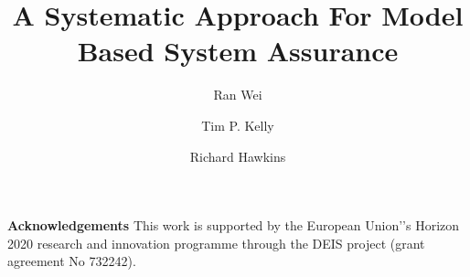 \documentclass[runningheads,a4paper]{llncs}
\begin{document}
 
\title{\textbf{A Systematic Approach For Model Based System Assurance}}
\author{Ran Wei \and Tim P. Kelly \and Richard Hawkins}
\maketitle















\noindent\textbf{Acknowledgements}
This work is supported by the European Union'’s Horizon 2020 research and innovation programme through the DEIS project (grant agreement No 732242). 

 
  
\end{document}

